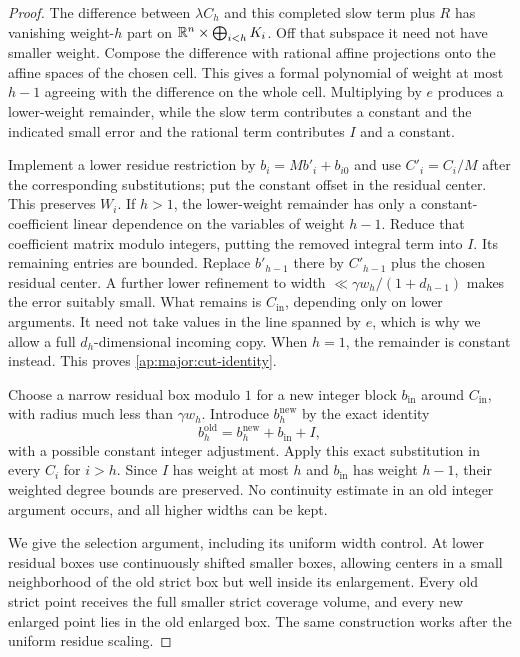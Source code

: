 \begin{proof}
The difference between $\lambda C_h$ and this completed slow term
plus $R$ has vanishing weight-$h$ part on
$\mathbb R^n\times\bigoplus_{i<h}K_i$.  Off that subspace it need not have
smaller weight.  Compose the difference with rational affine
projections onto the affine spaces of the chosen cell.  This gives
a formal polynomial of weight at most $h-1$ agreeing with the
difference on the whole cell.  Multiplying by $e$ produces a
lower-weight remainder, while the slow term contributes a constant
and the indicated small error and the rational term contributes
$I$ and a constant.

Implement a lower residue restriction by
$b_i=M b'_i+b_{i0}$ and use $C'_i=C_i/M$ after the corresponding
substitutions; put the constant offset in the residual center.
This preserves $W_i$.  If $h>1$, the lower-weight remainder has
only a constant-coefficient linear dependence on the variables of
weight $h-1$.  Reduce that coefficient matrix modulo integers,
putting the removed integral term into $I$.  Its remaining entries
are bounded.  Replace $b'_{h-1}$ there by $C'_{h-1}$ plus the chosen
residual center.  A further lower refinement to width
$\ll\gamma w_h/(1+d_{h-1})$ makes the error suitably small.  What
remains is $C_{\mathrm{in}}$, depending only on lower arguments.
It need not take values in the line spanned by $e$, which is why
we allow a full $d_h$-dimensional incoming copy.  When $h=1$, the
remainder is constant instead.  This proves
\eqref{ap:major:cut-identity}.

Choose a narrow residual box modulo $1$ for a new integer block
$b_{\mathrm{in}}$ around $C_{\mathrm{in}}$, with radius much less
than $\gamma w_h$.  Introduce $b_h^{\mathrm{new}}$ by the exact identity
\begin{equation}\label{ap:major:tuple-transport}
             b_h^{\mathrm{old}}
                 =b_h^{\mathrm{new}}+b_{\mathrm{in}}+I,
\end{equation}
with a possible constant integer adjustment.  Apply this exact
substitution in every $C_i$ for $i>h$.  Since $I$ has weight at
most $h$ and $b_{\mathrm{in}}$ has weight $h-1$, their weighted
degree bounds are preserved.  No continuity estimate in an old
integer argument occurs, and all higher widths can be kept.

We give the selection argument, including its uniform width control.
At lower residual boxes use continuously shifted smaller boxes,
allowing centers in a small neighborhood of the old strict box but
well inside its enlargement.  Every old strict point receives the
full smaller strict coverage volume, and every new enlarged point
lies in the old enlarged box.  The same construction works after
the uniform residue scaling.


\end{proof}
